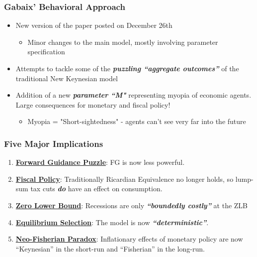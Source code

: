 \documentclass{beamer}
\begin{document}
\begin{frame}
	\frametitle{Gabaix' Behavioral Approach}
	\begin{itemize}
		\item New version of the paper posted on December 26th
		\begin{itemize}
			\item Minor changes to the main model, mostly involving parameter specification
		\end{itemize}
		\vspace{8pt}
		\item Attempts to tackle some of the \textit{\textbf{puzzling ``aggregate outcomes''}} of the traditional New Keynesian model
		\vspace{8pt}
		\item Addition of a new \textit{\textbf{parameter ``M"}} representing myopia of economic agents. Large consequences for monetary and fiscal policy!
		\vspace{8pt}
		\begin{itemize}
			\item Myopia = "Short-sightedness" - agents can't see very far into the future
		\end{itemize}
	\end{itemize}
\end{frame}


\begin{frame}
	\frametitle{Five Major Implications}
	\begin{enumerate}
		\item \textbf{\underline{Forward Guidance Puzzle}}: FG is now less powerful.
		\vspace{8pt}
		\item \textbf{\underline{Fiscal Policy}}: Traditionally Ricardian Equivalence no longer holds, so lump-sum tax cuts \textit{\textbf{do}} have an effect on consumption.
		\item \textbf{\underline{Zero Lower Bound}}: Recessions are only  \textit{\textbf{``boundedly costly''}} at the ZLB
		\item \textbf{\underline{Equilibrium Selection}}: The model is now \textit{\textbf{``deterministic''}}.
		\vspace{8pt}
		\item \underline{\textbf{Neo-Fisherian Paradox}}: Inflationary effects of monetary policy are now ``Keynesian'' in the short-run and ``Fisherian'' in the long-run.
	\end{enumerate}
\end{frame}
\end{document}
